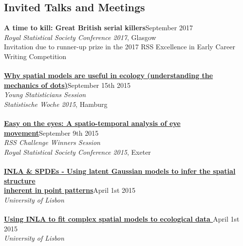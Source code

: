 \documentclass[10pt,letter]{res}
\begin{document}

\begin{resume}

  \noindent\makebox[\linewidth]{\rule{\paperwidth}{0.4pt}}

\section{Invited Talks and Meetings}
 \vspace{1mm}
        {\textbf{A time to kill: Great British serial killers}}\hfill  September 2017\\
        {\sl Royal Statistical Society Conference 2017}, Glasgow\\
        Invitation due to runner-up prize in the 2017 RSS Excellence in Early Career Writing Competition\\
\hdashrule[0.5ex]{4cm}{1pt}{1pt}\\
\href{https://drive.google.com/file/d/0B03uSZ5TT4NYWUJPMHpKdWpkdTQ/view?usp=sharing}{\textbf{Why spatial models are useful in ecology (understanding the \\
mechanics of dots)}}\hfill September 15th 2015\\
\textit{Young Statisticians Session}\\
 {\sl Statistische Woche 2015}, Hamburg\\
 \hdashrule[0.5ex]{4cm}{1pt}{1pt}\\ \href{https://drive.google.com/file/d/0B03uSZ5TT4NYZkFpU3Zwd2RqSHM/view?usp=sharing}{\textbf{Easy on the eyes: A spatio-temporal analysis of eye movement}}\hfill September 9th 2015\\
 \textit{RSS Challenge Winners Session}\\
 {\sl Royal Statistical Society Conference 2015}, Exeter\\
 \hdashrule[0.5ex]{4cm}{1pt}{1pt}\\
\href{https://drive.google.com/file/d/0B03uSZ5TT4NYanE4N2N6THMtZ28/view?usp=sharing} {\textbf{INLA \& SPDEs - 
Using latent Gaussian models to infer the spatial structure \\
inherent in point patterns}}\hfill April 1st 2015\\
 {\sl University of Lisbon}\\
 \hdashrule[0.5ex]{4cm}{1pt}{1pt}\\
 {\textbf{\href{http://www.startfactor.pt/training1.html}{Using INLA to fit complex spatial models to ecological data }}} \hfill April 1st 2015\\
 {\sl University of Lisbon}\\


\end{resume}
\end{document}
